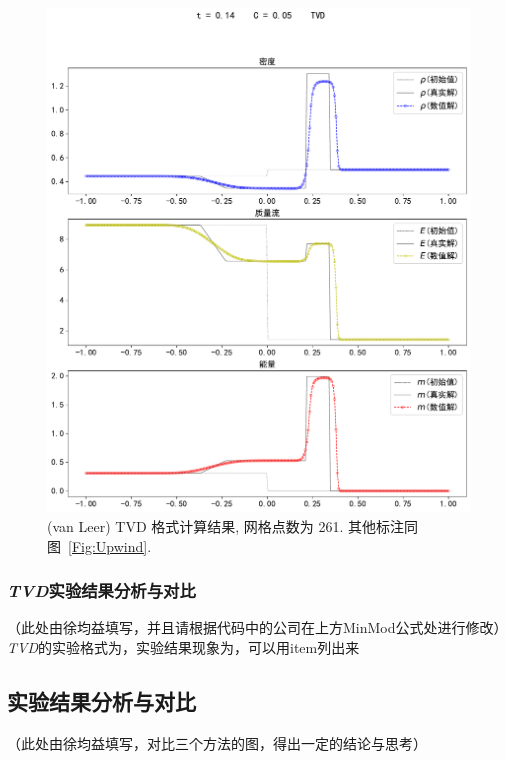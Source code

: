 \documentclass[10.5pt
]{article}
\begin{document}
\begin{figure}
\begin{center}
\includegraphics[width=.85\textwidth]{figures/limiter261.pdf}
\caption{(van Leer) TVD 格式计算结果, 网格点数为 261. 其他标注同图~\ref{Fig:Upwind}.}\label{Fig:vanLeerB}
\end{center}
\end{figure}
\subsubsection{\textit{TVD}实验结果分析与对比}
（此处由徐均益填写，并且请根据代码中的公司在上方MinMod公式处进行修改）
\textit{TVD}的实验格式为，实验结果现象为，可以用item列出来

\subsection{实验结果分析与对比}
（此处由徐均益填写，对比三个方法的图，得出一定的结论与思考）

\end{document}

